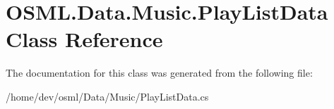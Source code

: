 \hypertarget{classOSML_1_1Data_1_1Music_1_1PlayListData}{}\section{O\+S\+M\+L.\+Data.\+Music.\+Play\+List\+Data Class Reference}
\label{classOSML_1_1Data_1_1Music_1_1PlayListData}


The documentation for this class was generated from the following file\+:\begin{DoxyCompactItemize}
\item 
/home/dev/osml/\+Data/\+Music/Play\+List\+Data.\+cs\end{DoxyCompactItemize}
